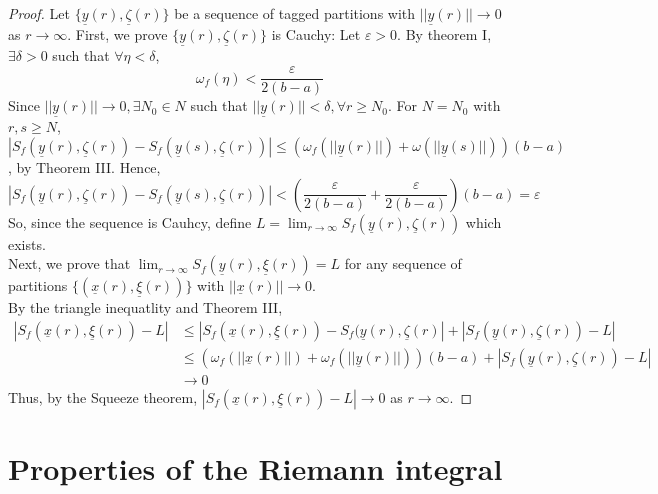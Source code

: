 \begin{proof}
    Let $\{\underline{y}(r), \underline{\zeta}(r)\}$ be a sequence of tagged partitions with $||\underline{y}(r)|| \to 0$ as $r \to \infty$.
    First, we prove $\{\underline{y}(r), \underline{\zeta}(r)\}$ is Cauchy: Let $\varepsilon > 0$. By theorem I, $\exists \delta>0$ such that $\forall \eta < \delta$,
    \begin{equation*}
        \omega_f(\eta) < \frac{\varepsilon}{2(b-a)}
    \end{equation*}
    Since $||\underline{y}(r)|| \to 0, \exists N_0 \in N$ such that $||\underline{y}(r)|| < \delta, \forall r \geq N_0$. For $N = N_0$ with $r,s \geq N$, $|S_f(\underline{y}(r), \underline{\zeta}(r)) - S_f(\underline{y}(s), \underline{\zeta}(r))| \leq (\omega_f(||\underline{y}(r)||) + \omega(||\underline{y}(s)||))(b-a)$, by Theorem III. Hence,
    \begin{equation*}
        |S_f(\underline{y}(r), \underline{\zeta}(r)) - S_f(\underline{y}(s), \underline{\zeta}(r))| < \left(
            \frac{\varepsilon}{2(b-a)} + \frac{\varepsilon}{2(b-a)}
        \right)(b-a) = \varepsilon
    \end{equation*}
    So, since the sequence is Cauhcy, define $L = \lim_{r \to \infty} S_f(\underline{y}(r), \underline{\zeta}(r))$ which exists. \\
    Next, we prove that $\lim_{r \to \infty} S_f(\underline{y}(r), \underline{\xi}(r)) = L$ for any sequence of partitions $\{(\underline{x}(r), \underline{\xi}(r))\}$ with $||\underline{x}(r)|| \to 0$. \\
    By the triangle inequatlity and Theorem III,
    \begin{align*}
        |S_f(\underline{x}(r), \underline{\xi}(r)) - L| &\leq |S_f(\underline{x}(r), \underline{\xi}(r)) - S_f(\underline{y}(r), \underline{\zeta}(r)| + |S_f(\underline{y}(r), \underline{\zeta}(r)) - L| \\
        &\leq (\omega_f(||\underline{x}(r)||) + \omega_f(||\underline{y}(r)||))(b-a) + |S_f(\underline{y}(r), \underline{\zeta}(r)) - L| \\
        &\to 0
    \end{align*}
    Thus, by the Squeeze theorem, $|S_f(\underline{x}(r), \underline{\xi}(r)) - L| \to 0$ as $r \to \infty$.
\end{proof}

\section{Properties of the Riemann integral}

